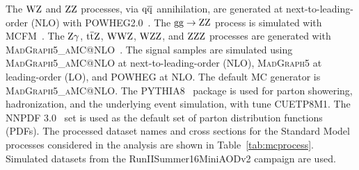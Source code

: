 The $\mbox{W}\mbox{Z}$ and $\mbox{Z}\mbox{Z}$ processes, via $\mathrm{q}\mathrm{\overline{q}}$ annihilation, 
are generated at next-to-leading-order (NLO) with 
\textsc{POWHEG2.0}~\cite{Alioli:2008gx,Nason:2004rx,Frixione:2007vw,powheg:2010}. 
The $\mathrm{g}\mathrm{g} \to \mbox{Z}\mbox{Z}$ process is simulated with MCFM~\cite{MCFM}. 
The $\mbox{Z}\gamma$, ${\mathrm{t}\overline{\mathrm{t}}} \mbox{Z}$, $\mbox{W}\mbox{W}\mbox{Z}$, $\mbox{W}\mbox{Z}\mbox{Z}$, and $\mbox{Z}\mbox{Z}\mbox{Z}$ 
processes are generated with \textsc{MadGraph5\_aMC@NLO}~\cite{Alwall:2014hca}.
The signal samples are simulated using \textsc{MadGraph5\_aMC@NLO} at next-to-leading-order (NLO), 
\textsc{MadGraph5} at leading-order (LO), and \textsc{POWHEG} at NLO. The 
default MC generator is \textsc{MadGraph5\_aMC@NLO}. 
The \textsc{PYTHIA8}~\cite{Sjostrand:2006za,Sjostrand:2015} package is used 
for parton showering, hadronization, and the underlying event simulation,
with tune CUETP8M1.
The NNPDF 3.0~\cite{nnpdf} set is used as the default set of parton distribution 
functions (PDFs). 
The processed dataset names and cross sections for the Standard Model processes considered 
in the analysis are shown in Table~\ref{tab:mcprocess}.
Simulated datasets from the RunIISummer16MiniAODv2 campaign are used.
\clearpage
